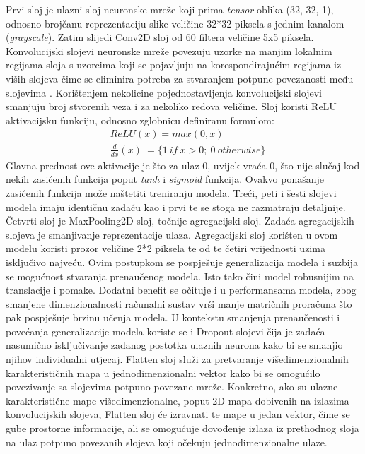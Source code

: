 \documentclass[times, utf8, zavrsni]{fer}
\begin{document}
Prvi sloj je ulazni sloj neuronske mreže koji prima \emph{tensor} oblika (32, 32, 1), odnosno brojčanu reprezentaciju slike veličine 32*32 piksela s jednim kanalom (\emph{grayscale}). Zatim slijedi Conv2D sloj od 60 filtera veličine 5x5 piksela.
Konvolucijski slojevi neuronske mreže povezuju uzorke na manjim lokalnim regijama sloja s uzorcima koji se pojavljuju na korespondirajućim regijama iz viših slojeva čime se eliminira potreba za stvaranjem potpune povezanosti među slojevima \citep{8308186}.
Korištenjem nekolicine pojednostavljenja konvolucijski slojevi smanjuju broj stvorenih veza i za nekoliko redova veličine.\citep{turner2014lecture}
Sloj koristi ReLU aktivacijsku funkciju, odnosno zglobnicu definiranu formulom: \begin{align*} &ReLU(x)= max(0,x)\\ &\frac{d}{dx}(x)\ = \{1\ if\ x>0;\ 0\ otherwise\} \end{align*}
Glavna prednost ove aktivacije je što za ulaz 0, uvijek vraća 0, što nije slučaj kod nekih zasićenih funkcija poput \emph{tanh} i \emph{sigmoid} funkcija. Ovakvo ponašanje zasićenih funkcija može naštetiti treniranju modela.
Treći, peti i šesti slojevi modela imaju identičnu zadaću kao i prvi te se stoga ne razmatraju detaljnije.
Četvrti sloj je MaxPooling2D sloj, točnije agregacijski sloj. Zadaća agregacijskih slojeva je smanjivanje reprezentacije ulaza. Agregacijski sloj korišten u ovom modelu koristi prozor veličine 2*2 piksela te od te četiri vrijednosti uzima isključivo najveću.
Ovim postupkom se pospješuje generalizacija modela i suzbija se mogućnost stvaranja prenaučenog modela. Isto tako čini model robusnijim na translacije i pomake. Dodatni benefit se očituje i u performansama modela, zbog smanjene dimenzionalnosti računalni sustav vrši manje matričnih proračuna
što pak pospješuje brzinu učenja modela. U kontekstu smanjenja prenaučenosti i povećanja generalizacije modela koriste se i Dropout slojevi čija je zadaća nasumično isključivanje zadanog postotka ulaznih neurona kako bi se smanjio njihov individualni utjecaj.
Flatten sloj služi za pretvaranje višedimenzionalnih karakterističnih mapa u jednodimenzionalni vektor kako bi se omogućilo povezivanje sa slojevima potpuno povezane mreže. Konkretno, ako su ulazne karakteristične mape višedimenzionalne, poput 2D mapa dobivenih na izlazima konvolucijskih slojeva, 
Flatten sloj će izravnati te mape u jedan vektor, čime se gube prostorne informacije, ali se omogućuje dovođenje izlaza iz prethodnog sloja na ulaz potpuno povezanih slojeva koji očekuju jednodimenzionalne ulaze. 
\end{document}
